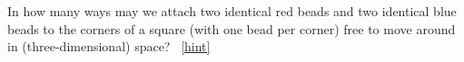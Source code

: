 \documentclass{book}
\begin{document}
\setcounter{project}{113}
\addtocounter{project}{-1}
\begin{activity}[]\label{twocolorsofbeads}
\hypertarget{p-819}{}%
In how many ways may we attach two identical red beads and two identical blue beads to the corners of a square (with one bead per corner) free to move around in (three-dimensional) space?%
~\hfill{\tiny\hyperlink{a-113}{[hint]}\hypertarget{q-113}{}}\end{activity}
\end{document}
